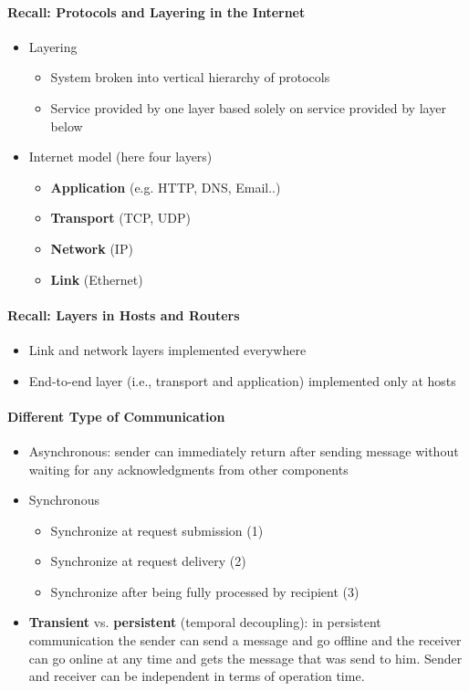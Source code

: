 \paragraph{Recall: Protocols and Layering in the Internet}
\begin{itemize}
\item Layering
  \begin{itemize}
  \item System broken into vertical hierarchy of protocols
  \item Service provided by one layer based solely
    on service provided by layer below
  \end{itemize}
\item Internet model (here four layers)
  \begin{itemize}
  \item \textbf{Application} (e.g. HTTP, DNS, Email..)
  \item \textbf{Transport} (TCP, UDP)
  \item \textbf{Network} (IP)
  \item \textbf{Link} (Ethernet)
  \end{itemize}
\end{itemize}

\paragraph{Recall: Layers in Hosts and Routers}
\begin{itemize}
\item Link and network layers implemented everywhere
\item End-to-end layer (i.e., transport and application)
  implemented only at hosts
\end{itemize}

\paragraph{Different Type of Communication}
\begin{itemize}
\item Asynchronous: sender can immediately return after sending message
  without waiting for any acknowledgments from other components

\item Synchronous
  \begin{itemize}
  \item Synchronize at request submission (1)
  \item Synchronize at request delivery (2)
  \item Synchronize after being fully processed by recipient (3)
  \end{itemize}

\item \textbf{Transient} vs. \textbf{persistent} (temporal decoupling):
  in persistent communication the sender can send a message
  and go offline and the receiver can go online at any time and
  gets the message that was send to him. Sender and receiver
  can be independent in terms of operation time.
\end{itemize}

